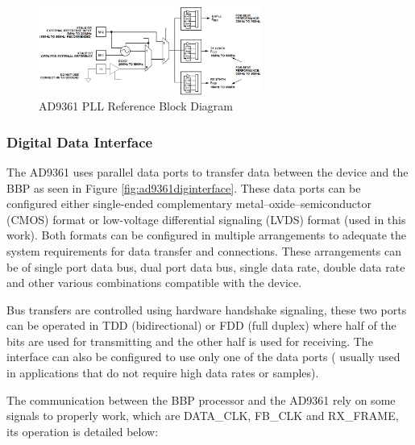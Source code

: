 \begin{figure}[htbp]
    \centering
    \includegraphics[width=0.65\textwidth]{./figures/pll_ref_block}
    \caption{ AD9361 PLL Reference Block Diagram
    \label{fig:pll}}
\end{figure}

\subsubsection{Digital Data Interface}

The AD9361 uses parallel data ports to transfer data between the device and the
BBP as seen in Figure \ref{fig:ad9361diginterface}. These data ports can be
configured either single-ended complementary metal–oxide–semiconductor (CMOS)
format or low-voltage differential signaling (LVDS) format (used in this work).
Both formats can be configured in multiple arrangements to adequate the system
requirements for data transfer and connections. These arrangements can be of
single port data bus, dual port data bus, single data rate, double data rate and
other various combinations compatible with the device.

Bus transfers are controlled using hardware handshake signaling, these two
ports can be operated in TDD (bidirectional) or FDD (full duplex) where half of
the bits are used for transmitting and the other half is used for receiving. The
interface can also be configured to use only one of the data ports ( usually
used in applications that do not require high data rates or samples).

The communication between the BBP processor and the AD9361
rely on some signals to properly work, which are DATA\_CLK, FB\_CLK and
RX\_FRAME, its operation is detailed below:

